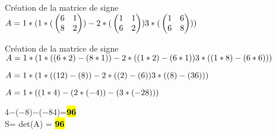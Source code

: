 \vspace{5mm} %

Création de la matrice de signe \\

$
A =
1*( \\
  1*( \\
  \begin{pmatrix}
    6 & 1 \\
    8 & 2 \\
  \end{pmatrix}
  ) \\
  -2*( \\
  \begin{pmatrix}
    1 & 1 \\
    6 & 2 \\
  \end{pmatrix}
  ) \\
  3*( \\
  \begin{pmatrix}
    1 & 6 \\
    6 & 8 \\
  \end{pmatrix}
  )\\
)\\
$

\vspace{5mm} %

Création de la matrice de signe \\

$
A =
1*( \\
  1*( (6*2)-(8*1) )  \\
  -2*( (1*2)-(6*1) ) \\
  3*( (1*8)-(6*6) )  \\
) \\
$

\vspace{5mm} %

$
A =
1*( \\
  1*( (12)-(8) )  \\
  -2*( (2)-(6) ) \\
  3*( (8)-(36) )  \\
) \\
$

\vspace{5mm} %

$
A =
1*( \\
  (1*4)  \\
  - (2*(-4)) \\
  - (3*(-28))  \\
) \\
$

\vspace{5mm} %
4−(−8)−(−84)=\hl{\textbf{96}} \\

\vspace{4mm} %
S= det(A) = \hl{\textbf{96}} \\
